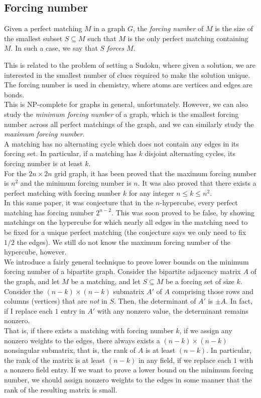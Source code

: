 \subsection{Forcing number}

\begin{fdef}
	Given a perfect matching $M$ in a graph $G$, the \emph{forcing number} of $M$ is the size of the smallest subset $S \subseteq M$ such that $M$ is the only perfect matching containing $M$. In such a case, we say that $S$ \emph{forces} $M$.
\end{fdef}
This is related to the problem of setting a Sudoku, where given a solution, we are interested in the smallest number of clues required to make the solution unique. The forcing number is used in chemistry, where atoms are vertices and edges are bonds.\\
This is \textsf{NP}-complete for graphs in general, unfortunately. However, we can also study the \emph{minimum forcing number} of a graph, which is the smallest forcing number across all perfect matchings of the graph, and we can similarly study the \emph{maximum forcing number}.\\

A matching has no alternating cycle which does not contain any edges in its forcing set. In particular, if a matching has $k$ disjoint alternating cycles, its forcing number is at least $k$.\\
For the $2n \times 2n$ grid graph, it has been proved that the maximum forcing number is $n^2$ and the minimum forcing number is $n$. It was also proved that there exists a perfect matching with forcing number $k$ for any integer $n \le k \le n^2$.\\
In this same paper, it was conjecture that in the $n$-hypercube, every perfect matching has forcing number $2^{n-2}$. This was soon proved to be false, by showing matchings on the hypercube for which nearly all edges in the matching need to be fixed for a unique perfect matching (the conjecture says we only need to fix $1/2$ the edges). We still do not know the maximum forcing number of the hypercube, however. \\

We introduce a fairly general technique to prove lower bounds on the minimum forcing number of a bipartite graph. Consider the bipartite adjacency matrix $A$ of the graph, and let $M$ be a matching, and let $S \subseteq M$ be a forcing set of size $k$. Consider the $(n-k) \times (n-k)$ submatrix $A'$ of $A$ comprising those rows and columns (vertices) that are \emph{not} in $S$. Then, the determinant of $A'$ is $\pm A$. In fact, if I replace each $1$ entry in $A'$ with any nonzero value, the determinant remains nonzero.\\
That is, if there exists a matching with forcing number $k$, if we assign any nonzero weights to the edges, there always exists a $(n-k) \times (n-k)$ nonsingular submatrix, that is, the rank of $A$ is at least $(n-k)$. In particular, the rank of the matrix is at least $(n-k)$ in any field, if we replace each $1$ with a nonzero field entry. If we want to prove a lower bound on the minimum forcing number, we should assign nonzero weights to the edges in some manner that the rank of the resulting matrix is small.

